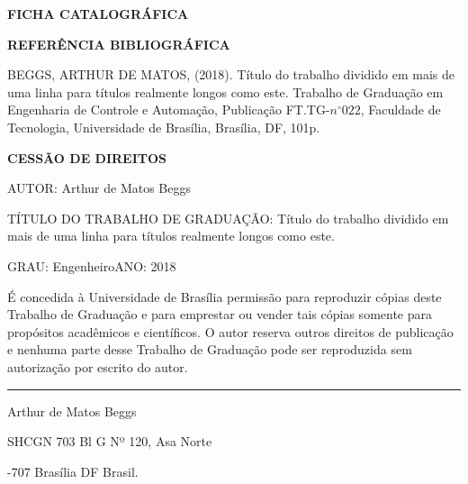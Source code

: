 \noindent \textbf{FICHA CATALOGRÁFICA}

\noindent %

\noindent \medskip{}


\noindent \textbf{REFERÊNCIA BIBLIOGRÁFICA}

BEGGS, ARTHUR DE MATOS, (2018). Título do trabalho dividido em mais de uma
linha para títulos realmente longos como este. Trabalho de Graduação
em Engenharia de Controle e Automação, Publicação FT.TG-$n^{\circ}022$,
Faculdade de Tecnologia, Universidade de Brasília, Brasília, DF, 101p.

\noindent \bigskip{}


\noindent \textbf{CESSÃO DE DIREITOS}

\noindent AUTOR: Arthur de Matos Beggs

TÍTULO DO TRABALHO DE GRADUAÇÃO: Título do trabalho dividido em mais
de uma linha para títulos realmente longos como este.

\noindent \medskip{}


\noindent GRAU: Engenheiro\hfill{}ANO: 2018\hfill{}

\noindent \medskip{}


É concedida à Universidade de Brasília permissão para reproduzir cópias
deste Trabalho de Graduação e para emprestar ou vender tais cópias
somente para propósitos acadêmicos e científicos. O autor reserva
outros direitos de publicação e nenhuma parte desse Trabalho de Graduação
pode ser reproduzida sem autorização por escrito do autor.

\noindent \bigskip{}


\noindent \rule[0.5ex]{1\columnwidth}{1pt}

\noindent Arthur de Matos Beggs

\noindent SHCGN 703 Bl G Nº 120, Asa Norte

-707 Brasília \textendash{} DF \textendash{} Brasil.
